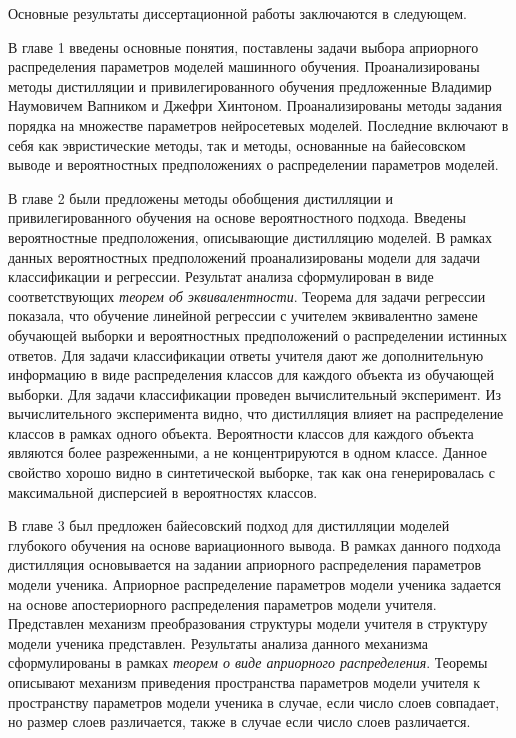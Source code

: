 Основные результаты диссертационной работы заключаются в следующем.

В главе 1 введены основные понятия, поставлены задачи выбора априорного распределения параметров моделей машинного обучения. Проанализированы методы дистилляции и привилегированного обучения предложенные Владимир Наумовичем Вапником и Джефри Хинтоном. Проанализированы методы задания порядка на множестве параметров нейросетевых моделей. Последние включают в себя как эвристические методы, так и методы, основанные на байесовском выводе и вероятностных предположениях о распределении параметров моделей.

В главе 2 были предложены методы обобщения дистилляции и привилегированного обучения на основе вероятностного подхода. Введены вероятностные предположения, описывающие дистилляцию моделей. В рамках данных вероятностных предположений проанализированы модели для задачи классификации и регрессии. Результат анализа сформулирован в виде  соответствующих \emph{теорем об эквивалентности}. Теорема для задачи регрессии показала, что обучение линейной регрессии с учителем эквивалентно замене обучающей выборки и вероятностных предположений о распределении истинных ответов. Для задачи классификации ответы учителя дают же дополнительную информацию в виде распределения классов для каждого объекта из обучающей выборки. Для задачи классификации проведен вычислительный эксперимент. Из вычислительного эксперимента видно, что дистилляция влияет на распределение классов в рамках одного объекта. Вероятности классов для каждого объекта являются более разреженными, а не концентрируются в одном классе. Данное свойство хорошо видно в синтетической выборке, так как она генерировалась с максимальной дисперсией в вероятностях классов.

В главе 3 был предложен байесовский подход для дистилляции моделей глубокого обучения на основе вариационного вывода. В рамках данного подхода дистилляция основывается на задании априорного распределения параметров модели ученика. Априорное распределение параметров модели ученика задается на основе апостериорного распределения параметров модели учителя. Представлен механизм преобразования структуры модели учителя в структуру модели ученика представлен. Результаты анализа данного механизма сформулированы в рамках \emph{теорем о виде априорного распределения}. Теоремы описывают механизм приведения пространства параметров модели учителя к пространству параметров модели ученика в случае, если число слоев совпадает, но размер слоев различается, также в случае если число слоев различается.

